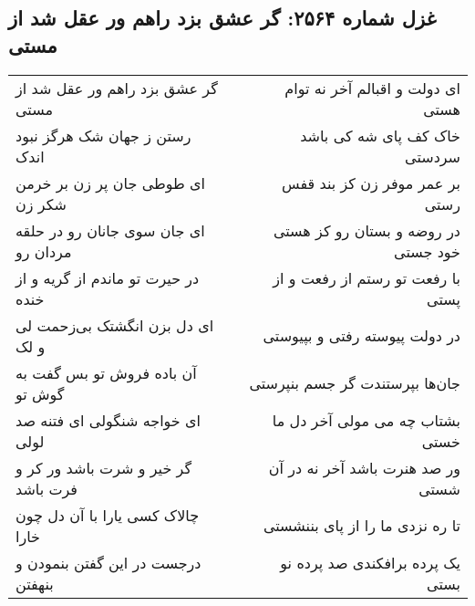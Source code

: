 \begin{center}
\section*{غزل شماره ۲۵۶۴: گر عشق بزد راهم ور عقل شد از مستی}
\label{sec:2564}
\begin{longtable}{l p{0.5cm} r}
گر عشق بزد راهم ور عقل شد از مستی
&&
ای دولت و اقبالم آخر نه توام هستی
\\
رستن ز جهان شک هرگز نبود اندک
&&
خاک کف پای شه کی باشد سردستی
\\
ای طوطی جان پر زن بر خرمن شکر زن
&&
بر عمر موفر زن کز بند قفس رستی
\\
ای جان سوی جانان رو در حلقه مردان رو
&&
در روضه و بستان رو کز هستی خود جستی
\\
در حیرت تو ماندم از گریه و از خنده
&&
با رفعت تو رستم از رفعت و از پستی
\\
ای دل بزن انگشتک بی‌زحمت لی و لک
&&
در دولت پیوسته رفتی و بپیوستی
\\
آن باده فروش تو بس گفت به گوش تو
&&
جان‌ها بپرستندت گر جسم بنپرستی
\\
ای خواجه شنگولی ای فتنه صد لولی
&&
بشتاب چه می مولی آخر دل ما خستی
\\
گر خیر و شرت باشد ور کر و فرت باشد
&&
ور صد هنرت باشد آخر نه در آن شستی
\\
چالاک کسی یارا با آن دل چون خارا
&&
تا ره نزدی ما را از پای بننشستی
\\
درجست در این گفتن بنمودن و بنهفتن
&&
یک پرده برافکندی صد پرده نو بستی
\\
\end{longtable}
\end{center}
